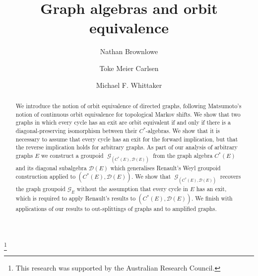 \documentclass[12pt, a4paper]{amsart}
\numberwithin{equation}{section}
\theoremstyle{definition}
\theoremstyle{remark}
\begin{document}
\title[Graph algebras and orbit equivalence]{Graph algebras and orbit equivalence}

\author{Nathan Brownlowe}
\address{Nathan Brownlowe and Michael F. Whittaker \\ School of Mathematics and
Applied Statistics  \\
The University of Wollongong\\
NSW  2522\\
AUSTRALIA} 
\author{Toke Meier Carlsen}
\address{Toke Meier Carlsen \\ Department of Mathematical Sciences \\ Norwegian University of Science and Technology (NTNU) \\
7491 Trondheim \\
NORWAY}
\author{Michael F. Whittaker}

\thanks{This research was supported by the Australian Research Council.}


\begin{abstract}
We introduce the notion of orbit equivalence of directed graphs,  
following Matsumoto's notion of 
continuous orbit equivalence for topological Markov shifts. We show that two 
graphs in which every cycle has an exit are orbit equivalent if and only if 
there is a diagonal-preserving isomorphism between their $C^*$-algebras. We 
show that it is necessary to assume that every cycle has an exit for the 
forward implication, but that the reverse implication holds for arbitrary 
graphs. As part of our 
analysis of arbitrary graphs $E$ we construct a groupoid 
${\operatorname{\mathcal{G}}}_{(C^*(E),\mathcal{D}(E))}$ from the graph algebra $C^*(E)$ and its 
diagonal subalgebra ${\mathcal{D}}(E)$ which generalises Renault's Weyl groupoid 
construction applied to $(C^*(E),{\mathcal{D}}(E))$. We show that 
${\operatorname{\mathcal{G}}}_{(C^*(E),\mathcal{D}(E))}$ recovers the graph 
groupoid ${\mathcal{G}}_E$ without the assumption that every cycle in $E$ has an exit, 
which is required to apply Renault's results to $(C^*(E),{\mathcal{D}}(E))$. We finish 
with applications of our results to out-splittings of graphs and to amplified 
graphs.
\end{abstract}

\maketitle
\end{document}
